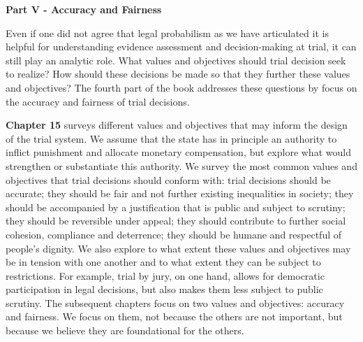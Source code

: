 \documentclass[
  10pt,
  dvipsnames,enabledeprecatedfontcommands]{scrartcl}
\begin{document}
\vspace{3mm}

\noindent \textbf{Part V - Accuracy and Fairness}

\noindent Even if one did not agree that legal probabilism as we have
articulated it is helpful for understanding evidence assessment and
decision-making at trial, it can still play an analytic role. What
values and objectives should trial decision seek to realize? How should
these decisions be made so that they further these values and
objectives? The fourth part of the book addresses these questions by
focus on the accuracy and fairness of trial decisions.

\textbf{Chapter 15} surveys different values and objectives that may
inform the design of the trial system. We assume that the state has in
principle an authority to inflict punishment and allocate monetary
compensation, but explore what would strengthen or substantiate this
authority. We survey the most common values and objectives that trial
decisions should conform with: trial decisions should be accurate; they
should be fair and not further existing inequalities in society; they
should be accompanied by a justification that is public and subject to
scrutiny; they should be reversible under appeal; they should contribute
to further social cohesion, compliance and deterrence; they should be
humane and respectful of people's dignity. We also explore to what
extent these values and objectives may be in tension with one another
and to what extent they can be subject to restrictions. For example,
trial by jury, on one hand, allows for democratic participation in legal
decisions, but also makes them less subject to public scrutiny. The
subsequent chapters focus on two values and objectives: accuracy and
fairness. We focus on them, not because the others are not important,
but because we believe they are foundational for the others.
\end{document}
